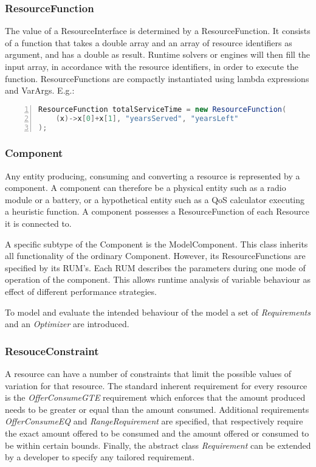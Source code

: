 \subsubsection{ResourceFunction}
The value of a ResourceInterface is determined by a ResourceFunction. It consists of a function that takes a double array and an array of resource identifiers as argument, and has a double as result. Runtime solvers or engines will then fill the input array, in accordance with the resource identifiers, in order to execute the function. ResourceFunctions are compactly instantiated using lambda expressions and VarArgs. E.g.:
\begin{lstlisting}[language=java, frame=single, numbers=left, tabsize=4, basicstyle=\small]
ResourceFunction totalServiceTime = new ResourceFunction(
	(x)->x[0]+x[1], "yearsServed", "yearsLeft"
);
\end{lstlisting}

\subsubsection{Component}
Any entity producing, consuming and converting a resource is represented by a component. A component can therefore be a physical entity such as a radio module or a battery, or a hypothetical entity such as a QoS calculator executing a heuristic function. A component possesses a ResourceFunction of each Resource it is connected to.

A specific subtype of the Component is the ModelComponent. This class inherits all functionality of the ordinary Component. However, its ResourceFunctions are specified by its RUM's. Each RUM describes the parameters during one mode of operation of the component. This allows runtime analysis of variable behaviour as effect of different performance strategies.

To model and evaluate the intended behaviour of the model a set of \emph{Requirements} and an \emph{Optimizer} are introduced.
\subsubsection{ResouceConstraint}
A resource can have a number of constraints that limit the possible values of variation for that resource. The standard inherent requirement for every resource is the \emph{OfferConsumeGTE} requirement which enforces that the amount produced needs to be greater or equal than the amount consumed. Additional requirements \emph{OfferConsumeEQ} and \emph{RangeRequirement} are specified, that respectively require the exact amount offered to be consumed and the amount offered or consumed to be within certain bounds. Finally, the abstract class \emph{Requirement} can be extended by a developer to specify any tailored requirement.


